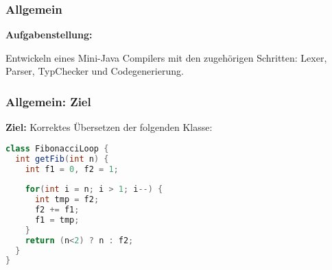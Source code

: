 \begin{frame}
	\frametitle{Allgemein}
	
\textbf{Aufgabenstellung:}

Entwickeln eines Mini-Java Compilers mit den zugehörigen Schritten: Lexer, Parser, TypChecker und Codegenerierung.
\end{frame}

\begin{frame}[fragile]
\frametitle{Allgemein: Ziel}

\textbf{Ziel:} Korrektes Übersetzen der folgenden Klasse:

\begin{lstlisting}[language=Java]
class FibonacciLoop {
  int getFib(int n) {
    int f1 = 0, f2 = 1;
   
    for(int i = n; i > 1; i--) {
      int tmp = f2;
      f2 += f1;
      f1 = tmp;
    }
    return (n<2) ? n : f2;
  }
}
\end{lstlisting}	
\end{frame}

